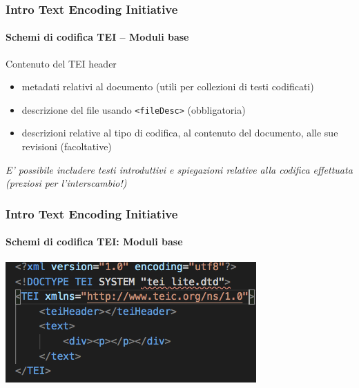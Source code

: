 \begin{frame}
	\frametitle{Intro Text Encoding Initiative}
	\framesubtitle{Schemi di codifica TEI – Moduli base}
	\addtocounter{nframe}{1}

    \begin{block}{Contenuto del TEI header}
        \begin{itemize}
            \item metadati relativi al documento (utili per collezioni di testi
            codificati)
            \item descrizione del file usando \texttt{<fileDesc>} (obbligatoria)
            \item descrizioni relative al tipo di codifica, al contenuto del
            documento, alle sue revisioni (facoltative)
        \end{itemize}
    \end{block}
\textit{E' possibile includere testi introduttivi e spiegazioni relative alla
codifica effettuata (preziosi per l’interscambio!)}

\end{frame}


\begin{frame}
	\frametitle{Intro Text Encoding Initiative}
	\framesubtitle{Schemi di codifica TEI:  Moduli base}
	\addtocounter{nframe}{1}

	\begin{center}

		\includegraphics[width=.95\textwidth]{imgs/esempio1.png}
    \end{center}
\end{frame}


